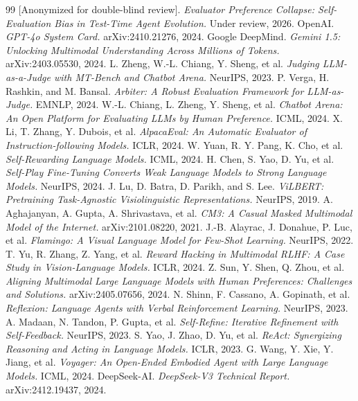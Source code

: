 \documentclass[11pt,a4paper]{article}
\begin{document}

\begin{thebibliography}{99}
 [Anonymized for double-blind review]. \textit{Evaluator Preference Collapse: Self-Evaluation Bias in Test-Time Agent Evolution.} Under review, 2026.
 OpenAI. \textit{GPT-4o System Card.} arXiv:2410.21276, 2024.
 Google DeepMind. \textit{Gemini 1.5: Unlocking Multimodal Understanding Across Millions of Tokens.} arXiv:2403.05530, 2024.
 L. Zheng, W.-L. Chiang, Y. Sheng, et al. \textit{Judging LLM-as-a-Judge with MT-Bench and Chatbot Arena.} NeurIPS, 2023.
 P. Verga, H. Rashkin, and M. Bansal. \textit{Arbiter: A Robust Evaluation Framework for LLM-as-Judge.} EMNLP, 2024.
 W.-L. Chiang, L. Zheng, Y. Sheng, et al. \textit{Chatbot Arena: An Open Platform for Evaluating LLMs by Human Preference.} ICML, 2024.
 X. Li, T. Zhang, Y. Dubois, et al. \textit{AlpacaEval: An Automatic Evaluator of Instruction-following Models.} ICLR, 2024.
 W. Yuan, R. Y. Pang, K. Cho, et al. \textit{Self-Rewarding Language Models.} ICML, 2024.
 H. Chen, S. Yao, D. Yu, et al. \textit{Self-Play Fine-Tuning Converts Weak Language Models to Strong Language Models.} NeurIPS, 2024.
 J. Lu, D. Batra, D. Parikh, and S. Lee. \textit{ViLBERT: Pretraining Task-Agnostic Visiolinguistic Representations.} NeurIPS, 2019.
 A. Aghajanyan, A. Gupta, A. Shrivastava, et al. \textit{CM3: A Casual Masked Multimodal Model of the Internet.} arXiv:2101.08220, 2021.
 J.-B. Alayrac, J. Donahue, P. Luc, et al. \textit{Flamingo: A Visual Language Model for Few-Shot Learning.} NeurIPS, 2022.
 T. Yu, R. Zhang, Z. Yang, et al. \textit{Reward Hacking in Multimodal RLHF: A Case Study in Vision-Language Models.} ICLR, 2024.
 Z. Sun, Y. Shen, Q. Zhou, et al. \textit{Aligning Multimodal Large Language Models with Human Preferences: Challenges and Solutions.} arXiv:2405.07656, 2024.
 N. Shinn, F. Cassano, A. Gopinath, et al. \textit{Reflexion: Language Agents with Verbal Reinforcement Learning.} NeurIPS, 2023.
 A. Madaan, N. Tandon, P. Gupta, et al. \textit{Self-Refine: Iterative Refinement with Self-Feedback.} NeurIPS, 2023.
 S. Yao, J. Zhao, D. Yu, et al. \textit{ReAct: Synergizing Reasoning and Acting in Language Models.} ICLR, 2023.
 G. Wang, Y. Xie, Y. Jiang, et al. \textit{Voyager: An Open-Ended Embodied Agent with Large Language Models.} ICML, 2024.
 DeepSeek-AI. \textit{DeepSeek-V3 Technical Report.} arXiv:2412.19437, 2024.
\end{thebibliography}
\end{document}
